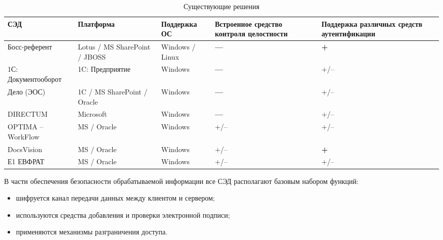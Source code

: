 \begin{table}[h!]
  \captionsetup{justification=raggedright}
  \caption{Существующие решения}\label{table:products}
 \begin{center}
  \begin{tabular}{| >{\centering}m{3cm} | >{\centering}m{3cm} | >{\centering}m{2cm} | >{\centering}m{3cm} | >{\centering}m{3cm} |}
  \hline
  \rowcolor{Gray} СЭД   & Платформа & Поддержка ОС & Встроенное средство контроля целостности & Поддержка различных средств аутентификации  \tabularnewline \hline
  Босс-референт & \color{Green} Lotus / MS SharePoint / JBOSS & \color{Green} Windows / Linux & \color{Red} \textbf{---} &  \color{Green} \textbf{+} \tabularnewline \hline

  1С: Документооборот & \color{Red} 1C: Предприятие & \color{Red} Windows & \color{Red} \textbf{---} & +/-- \tabularnewline \hline




  Дело (ЭОС) & \color{Green} 1C / MS SharePoint / Oracle & \color{Red} Windows & \color{Red} \textbf{---} & +/--  \tabularnewline \hline

  DIRECTUM & \color{Red} Microsoft & \color{Red} Windows  & \color{Red} \textbf{---} & +/--  \tabularnewline \hline

  OPTIMA -- WorkFlow & \color{Green} MS / Oracle & \color{Red} Windows & +/-- & +/--   \tabularnewline \hline

  DocsVision & \color{Green} MS / Oracle & \color{Red} Windows  & +/-- & \color{Green} \textbf{+} \tabularnewline \hline

  Е1 ЕВФРАТ & \color{Green} MS / Oracle & \color{Red} Windows & +/-- & +/--  \tabularnewline \hline
  \end{tabular}
 \end{center}
\end{table}

\vspace{\baselineskip}
В части обеспечения безопасности обрабатываемой информации все СЭД располагают базовым набором функций:
\begin{itemize}
  \item шифруется канал передачи данных между клиентом и сервером;
  \item используются средства добавления и проверки электронной подписи;
  \item применяются механизмы разграничения доступа.
\end{itemize}


